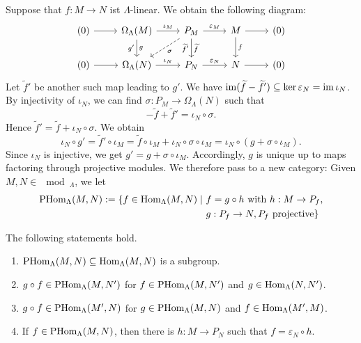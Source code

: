 %



\begin{remark}
Suppose that $f:M\to N$ ist $\Lambda$-linear. We obtain the following diagram:
%
\[
\begin{tikzcd}
	(0)\ar[r] & \Omega_\Lambda(M)\rar["\iota_M"] \ar[d,"g", "g'"'] & P_M\rar["\varepsilon_M"] \ar[d, "\widetilde f","\widetilde f'"']\ar[dl,dashed, "\sigma"] & M\ar[r]\ar[d, "f"] & (0) \\
	(0)\ar[r] & \Omega_\Lambda(N)\rar["\iota_N"] & P_N\rar["\varepsilon_N"] & N\ar[r] & (0)
\end{tikzcd}
\]
%
Let $\widetilde f'$ be another such map leading to $g'$.
%
We have $\operatorname{im}(\widetilde f-\widetilde f')\subseteq \ker\varepsilon_N = \operatorname{im} \iota_N$. By injectivity of $\iota_N$, we can find $\sigma:P_M\to \Omega_\Lambda(N)$ such that
\[
-\widetilde f + \widetilde f' = \iota_N \circ \sigma.
\]
Hence $\widetilde f' = \widetilde f + \iota_N \circ \sigma$. We obtain
\[
\iota_N \circ g'
 = \widetilde f ' \circ \iota_M
 = \widetilde f \circ \iota_M + \iota_N \circ \sigma \circ \iota_M
 = \iota_N \circ (g + \sigma\circ \iota_M).
\]
Since $\iota_N$ is injective, we get $g'=g+\sigma\circ\iota_M$. Accordingly, $g$ is unique up to maps factoring through projective modules. We therefore pass to a new category: Given $M,N\in\mod_\Lambda$, we let
\begin{align*}
\operatorname{PHom}_\Lambda(M,N) := \{ f \in\operatorname{Hom}_\Lambda(M,N) \mid \ & f = g \circ h \text{ with } h : M\to P_f, \\
    & g:P_f\to N, P_f \text{ projective} \}
\end{align*}
\end{remark}


\begin{lemma}\label{2.2.2}
The following statements hold.
\begin{enumerate}
\item $\operatorname{PHom}_\Lambda(M,N)\subseteq \operatorname{Hom}_\Lambda(M,N)$ is a subgroup.
\item $g\circ f\in \operatorname{PHom}_\Lambda(M,N')$ for $f\in \operatorname{PHom}_\Lambda(M,N')$ and $g\in \operatorname{Hom}_\Lambda(N,N')$.
\item $g\circ f\in \operatorname{PHom}_\Lambda(M',N)$ for $g\in \operatorname{PHom}_\Lambda(M,N)$ and $f\in \operatorname{Hom}_\Lambda(M',M)$.
\item If $f\in\operatorname{PHom}_\Lambda(M,N)$, then there is $h:M\to P_N$ such that $f=\varepsilon_N\circ h$.
\end{enumerate}
\end{lemma}

